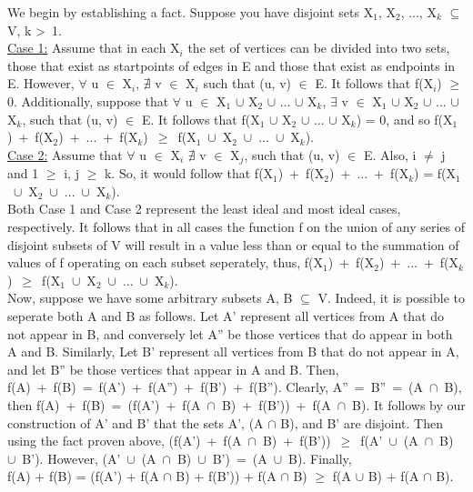 \documentclass[10pt]{csc_assignment}
\begin{document}
\begin{description}
We begin by establishing a fact. Suppose you have disjoint sets X$_{1}$, X$_{2}$, ..., X$_{k}$  $\subseteq$ V, k \textgreater ~1. \\
\underline{Case 1:} Assume that in each X$_{i}$ the set of vertices can be divided into two sets, those that exist as startpoints of edges in E and those that exist as endpoints in E. 
However, $\forall$ u $\in$ X$_{i}$, $\nexists$ v $\in$ X$_{i}$ such that (u, v) $\in$ E. It follows that f(X$_{i}$) $\geqslant$ 0. Additionally, suppose that $\forall$ u $\in$ X$_{1}$ $\cup$ X$_{2}$ $\cup$ ... $\cup$ X$_{k}$, $\exists$ v $\in$ X$_{1}$ $\cup$ X$_{2}$ $\cup$ ... $\cup$  X$_{k}$, such that (u, v) $\in$ E. It follows that f(X$_{1}$ $\cup$ X$_{2}$ $\cup$ ... $\cup$  X$_{k}$) = 0, and so \mbox{f(X$_{1}$) + f(X$_{2}$) + ... + f(X$_{k}$) $\geqslant$ f(X$_{1}$ $\cup$ X$_{2}$ $\cup$ ... $\cup$  X$_{k}$).}\\
\underline{Case 2:} Assume that $\forall$ u $\in$ X$_{i}$ $\nexists$ v $\in$ X$_{j}$, such that (u, v) $\in$ E. Also, i $\neq$ j and 1 $\geqslant$ i, j $\geqslant$ k. So, it would follow that \mbox{f(X$_{1}$) + f(X$_{2}$) + ... + f(X$_{k}$)} = \mbox{f(X$_{1}$ $\cup$ X$_{2}$ $\cup$ ... $\cup$  X$_{k}$).}\\ 

Both Case 1 and Case 2 represent the least ideal and most ideal cases, respectively. It follows that in all cases the function f on the union of any series of disjoint subsets of V will result in a value less than or equal to the summation of values of f operating on each subset seperately, thus, \mbox{f(X$_{1}$) + f(X$_{2}$) + ... + f(X$_{k}$) $\geqslant$ f(X$_{1}$ $\cup$ X$_{2}$ $\cup$ ... $\cup$  X$_{k}$).}\\

Now, suppose we have some arbitrary subsets A, B $\subseteq$ V. Indeed, it is possible to seperate both A and B as follows. Let A' represent all vertices from A that do not appear in B, and conversely let A'' be those vertices that do appear in both A and B. Similarly, Let B' represent all vertices from B that do not appear in A, and let B'' be those vertices that appear in A and B. Then, \mbox{f(A) + f(B) = f(A') + f(A'') + f(B') + f(B'')}. Clearly, \mbox{A'' = B'' = (A $\cap$ B)}, then \mbox{f(A) + f(B) = (f(A') + f(A $\cap$ B) + f(B')) + f(A $\cap$ B)}. It follows by our construction of A' and B' that the sets A', (A $\cap$ B), and B' are disjoint. Then using the fact proven above, \mbox{(f(A') + f(A $\cap$ B) + f(B')) $\geqslant$ f(A' $\cup$ (A $\cap$ B) $\cup$ B').} However, \mbox{(A' $\cup$ (A $\cap$ B) $\cup$ B') = (A $\cup$ B)}. Finally, \\f(A) + f(B) = (f(A') + f(A $\cap$ B) + f(B')) + f(A $\cap$ B) $\geqslant$ f(A $\cup$ B) + f(A $\cap$ B). \\


\end{description}
\end{document}
